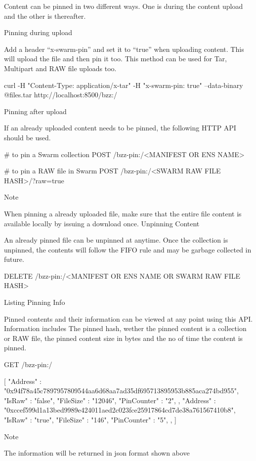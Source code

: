 Content can be pinned in two different ways. One is during the content upload and the other is thereafter.

    Pinning during upload

    Add a header “x-swarm-pin” and set it to “true” when uploading content. This will upload the file and then pin it too. This method can be used for Tar, Multipart and RAW file uploads too.

curl -H "Content-Type: application/x-tar" -H "x-swarm-pin: true"  --data-binary @files.tar http://localhost:8500/bzz:/

    Pinning after upload

    If an already uploaded content needs to be pinned, the following HTTP API should be used.

# to pin a Swarm collection
POST /bzz-pin:/<MANIFEST OR ENS NAME>

# to pin a RAW file in Swarm
POST /bzz-pin:/<SWARM RAW FILE HASH>/?raw=true

Note

When pinning a already uploaded file, make sure that the entire file content is available locally by issuing a download once.
Unpinning Content

An already pinned file can be unpinned at anytime. Once the collection is unpinned, the contents will follow the FIFO rule and may be garbage collected in future.

DELETE /bzz-pin:/<MANIFEST OR ENS NAME OR SWARM RAW FILE HASH>

Listing Pinning Info

Pinned contents and their information can be viewed at any point using this API. Information includes The pinned hash, wether the pinned content is a collection or RAW file, the pinned content size in bytes and the no of time the content is pinned.

GET /bzz-pin:/

[
 { "Address"    : "0x94f78a45c7897957809544aa6d68aa7ad35df695713895953b885aca274bd955",
   "IsRaw"      : "false",
   "FileSize"   : "12046",
   "PinCounter" : "2",
 },
 { "Address"    : "0xccef599d1a13bed9989e424011aed2c023fce25917864cd7de38a761567410b8",
   "IsRaw"      : "true",
   "FileSize"   : "146",
   "PinCounter" : "5",
 },
]

Note

The information will be returned in json format shown above
